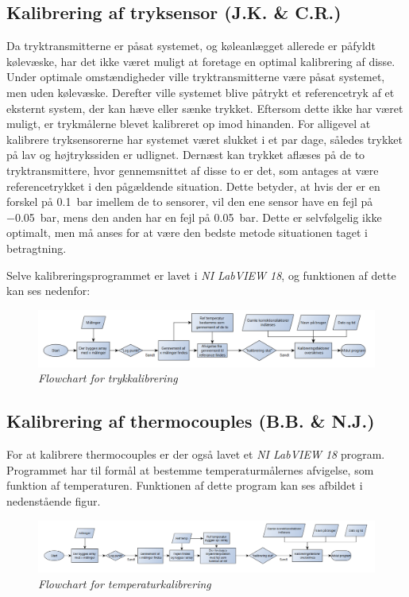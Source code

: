 \documentclass[../Hovedrapport.tex]{subfiles}
\begin{document}
\subsection{Kalibrering af tryksensor  (J.K. \& C.R.)}
Da tryktransmitterne er påsat systemet, og køleanlægget allerede er påfyldt kølevæske, har det ikke været muligt at foretage en optimal kalibrering af disse.
Under optimale omstændigheder ville tryktransmitterne være påsat systemet, men uden kølevæske. Derefter ville systemet blive påtrykt et referencetryk af et eksternt system, der kan hæve eller sænke trykket.
Eftersom dette ikke har været muligt, er trykmålerne blevet kalibreret op imod hinanden. 
For alligevel at kalibrere tryksensorerne har systemet været slukket i et par dage, således trykket på lav og højtrykssiden er udlignet. Dernæst kan trykket aflæses på de to tryktransmittere, hvor gennemsnittet af disse to er det, som antages at være referencetrykket i den pågældende situation. Dette betyder, at hvis der er en forskel på \SI{0,1}{bar} imellem de to sensorer, vil den ene sensor have en fejl på \SI{-0,05}{bar}, mens den anden har en fejl på \SI{0,05}{bar}. 
Dette er selvfølgelig ikke optimalt, men må anses for at være den bedste metode situationen taget i betragtning. 

Selve kalibreringsprogrammet er lavet i \textit{NI LabVIEW 18}, og funktionen af dette kan ses nedenfor:
\begin{figure}[H]
    \centering
    \includegraphics[width=1.0\textwidth]{Billeder/kali_tryk.png}
    \caption{\textit{Flowchart for trykkalibrering}}
    \label{fig:fc_tryk_kali}
\end{figure}
\subsection{Kalibrering af thermocouples (B.B. \& N.J.)}
For at kalibrere thermocouples er der også lavet et \textit{NI LabVIEW 18} program. Programmet har til formål at bestemme temperaturmålernes afvigelse, som funktion af temperaturen.
Funktionen af dette program kan ses afbildet i nedenstående figur.
\begin{figure}[H]
\centering
\includegraphics[width=1.0\textwidth]{Billeder/kai_thermo.png}
\caption{\textit{Flowchart for temperaturkalibrering}}
\label{fig:fc_tryk_kali}
\end{figure}
\end{document}
